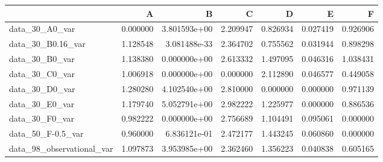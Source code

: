 \begin{tabular}{lrrrrrr}
\toprule
{} &         A &             B &         C &         D &         E &         F \\
\midrule
data\_30\_A0\_var            &  0.000000 &  3.801593e+00 &  2.209947 &  0.826934 &  0.027419 &  0.926906 \\
data\_30\_B0.16\_var         &  1.128548 &  3.081488e-33 &  2.364702 &  0.755562 &  0.031944 &  0.898298 \\
data\_30\_B0\_var            &  1.138380 &  0.000000e+00 &  2.613332 &  1.497095 &  0.046316 &  1.038431 \\
data\_30\_C0\_var            &  1.006918 &  0.000000e+00 &  0.000000 &  2.112890 &  0.046577 &  0.449058 \\
data\_30\_D0\_var            &  1.280280 &  4.102540e+00 &  2.810000 &  0.000000 &  0.000000 &  0.971139 \\
data\_30\_E0\_var            &  1.179740 &  5.052791e+00 &  2.982222 &  1.225977 &  0.000000 &  0.886536 \\
data\_30\_F0\_var            &  0.982222 &  0.000000e+00 &  2.756689 &  1.104491 &  0.095061 &  0.000000 \\
data\_50\_F-0.5\_var         &  0.960000 &  6.836121e-01 &  2.472177 &  1.443245 &  0.060860 &  0.000000 \\
data\_98\_observational\_var &  1.097873 &  3.953985e+00 &  2.362460 &  1.356223 &  0.040838 &  0.605165 \\
\bottomrule
\end{tabular}
